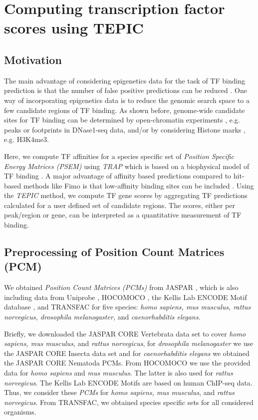\documentclass{article}
\begin{document}
\section*{Computing transcription factor scores using TEPIC}
\subsection*{Motivation}
The main advantage of considering epigenetics data for the task of TF binding prediction is that the number of false positive predictions can be reduced \cite{pmid21106904}.
One way of incorporating epigenetics data is to reduce the genomic search space to a few candidate regions of TF binding. 
As shown before, genome-wide candidate sites for TF binding can be determined by open-chromatin experiments \cite{pmid25294828,pmid25086003,pmid22072382,pmid23424114}, e.g. peaks or footprints in DNase1-seq data, 
and/or by considering Histone marks \cite{pmid25489339,pmid25086003}, e.g. H3K4me3. 

Here, we compute TF affinities for a species specific set of \textit{Position Specific Energy Matrices (PSEM)} using \textit{TRAP} \cite{pmid17098775} which is based on a biophysical model of TF binding \cite{von1986specificity}. 
A major advantage of affinity based predictions compared to hit-based methods like Fimo \cite{Grant16022011} is that 
low-affinity binding sites can be included \cite{pmid27899623,pmid17098775}. Using the \textit{TEPIC} method, we compute TF gene scores by aggregating TF predictions calculated for a user defined set of candidate regions.
The scores, either per peak/region or gene, can be interpreted as a quantitative measurement of TF binding. 

\subsection*{Preprocessing of Position Count Matrices (PCM)}
We obtained \textit{Position Count Matrices (PCMs)} from JASPAR \cite{pmid26531826}, which is also including data from Uniprobe \cite{pmid25378322}, HOCOMOCO \cite{pmid23175603}, the Kellis Lab ENCODE Motif database \cite{pmid24335146}, and TRANSFAC \cite{pmid16381825} for five
species: \textit{homo sapiens, mus musculus, rattus norvegicus, drosophila melanogaster,} and \textit{caenorhabditis elegans}. 

Briefly, we downloaded the JASPAR CORE Vertebrata data set to cover \textit{homo sapiens, mus musculus,} and \textit{rattus norvegicus}, 
for \textit{drosophila melanogaster} we use the JASPAR CORE Insecta data set and for \textit{caenorhabditis elegans} we obtained the JASPAR CORE Nematoda PCMs.
From HOCOMOCO we use the provided data for \textit{homo sapiens} and \textit{mus musculus}. The latter is also used for \textit{rattus norvegicus}. 
The Kellis Lab ENCODE Motifs are based on human ChIP-seq data. Thus, we consider these \textit{PCMs} for \textit{homo sapiens, mus musculus}, and \textit{rattus norvegicus}.
From TRANSFAC, we obtained species specific sets for all considered organisms. 
\end{document}
